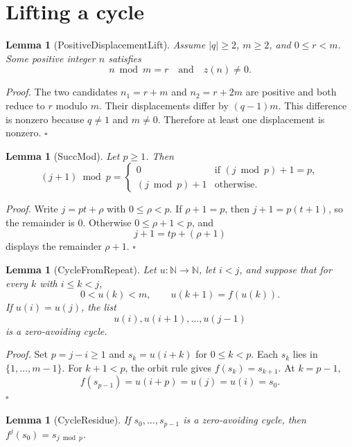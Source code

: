 \documentclass[11pt,letterpaper]{article}
\newcommand{\N}{\mathbb{N}}
\newtheorem{lemma}[theorem]{Lemma}
\newenvironment{proof}{\noindent\textit{Proof.}}{\hfill\(\square\)}
\begin{document}
\section{Lifting a cycle}

\begin{lemma}[PositiveDisplacementLift]
Assume \(|q|\ge 2\), \(m\ge 2\), and \(0\le r<m\). Some positive integer \(n\) satisfies
\[
  n\bmod m=r
  \quad\text{and}\quad
  z(n)\ne 0.
\]
\end{lemma}

\begin{proof}
The two candidates \(n_1=r+m\) and \(n_2=r+2m\) are positive and both reduce to \(r\) modulo \(m\). Their displacements differ by \((q-1)m\). This difference is nonzero because \(q\ne 1\) and \(m\ne 0\). Therefore at least one displacement is nonzero.
\end{proof}

\begin{lemma}[SuccMod]
Let \(p\ge 1\). Then
\[
  (j+1)\bmod p=
  \begin{cases}
    0 & \text{if }(j\bmod p)+1=p,\\
    (j\bmod p)+1 & \text{otherwise.}
  \end{cases}
\]
\end{lemma}

\begin{proof}
Write \(j=pt+\rho\) with \(0\le\rho<p\). If \(\rho+1=p\), then \(j+1=p(t+1)\), so the remainder is \(0\). Otherwise \(0\le\rho+1<p\), and
\[
  j+1=tp+(\rho+1)
\]
displays the remainder \(\rho+1\).
\end{proof}

\begin{lemma}[CycleFromRepeat]
Let \(u:\N\to\N\), let \(i<j\), and suppose that for every \(k\) with \(i\le k<j\),
\[
  0<u(k)<m,\qquad u(k+1)=f(u(k)).
\]
If \(u(i)=u(j)\), the list
\[
  u(i),u(i+1),\ldots,u(j-1)
\]
is a zero-avoiding cycle.
\end{lemma}

\begin{proof}
Set \(p=j-i\ge 1\) and \(s_k=u(i+k)\) for \(0\le k<p\). Each \(s_k\) lies in \(\{1,\ldots,m-1\}\). For \(k+1<p\), the orbit rule gives \(f(s_k)=s_{k+1}\). At \(k=p-1\),
\[
  f(s_{p-1})=u(i+p)=u(j)=u(i)=s_0.
\]
\end{proof}

\begin{lemma}[CycleResidue]
If \(s_0,\ldots,s_{p-1}\) is a zero-avoiding cycle, then \(f^{j}(s_0)=s_{j\bmod p}\).
\end{lemma}
\end{document}
